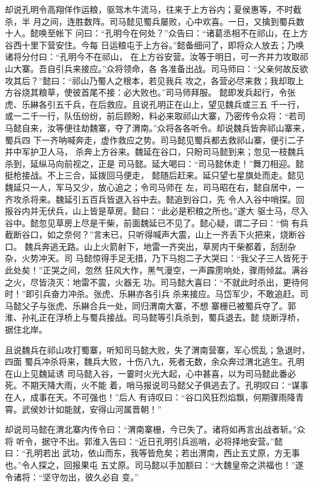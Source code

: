却说孔明令高翔佯作运粮，驱驾木牛流马，往来于上方谷内；夏侯惠等，不时截杀，半
月之间，连胜数阵。司马懿见蜀兵屡败，心中欢喜。一日，又擒到蜀兵数十人。懿唤至帐下
问曰：“孔明今在何处？”众告曰：“诸葛丞相不在祁山，在上方谷西十里下营安住。今每
日运粮屯于上方谷。”懿备细问了，即将众人放去；乃唤诸将分付曰：“孔明今不在祁山，
在上方谷安营。汝等于明日，可一齐并力攻取祁山大寨。吾自引兵来接应。”众将领命，各
各准备出战。司马师曰：“父亲何故反欲攻其后？”懿曰：“祁山乃蜀人之根本，若见我兵
攻之，各营必尽来救；我却取上方谷烧其粮草，使彼首尾不接：必大败也。”司马师拜服。
懿即发兵起行，令张虎、乐綝各引五千兵，在后救应。且说孔明正在山上，望见魏兵或三五
千一行，或一二千一行，队伍纷纷，前后顾盼，料必来取祁山大寨，乃密传令众将：“若司
马懿自来，汝等便往劫魏寨，夺了渭南。”众将各各听令。却说魏兵皆奔祁山寨来，蜀兵四
下一齐呐喊奔走，虚作救应之势。司马懿见蜀兵都去救祁山寨，便引二子并中军护卫人马，
杀奔上方谷来。魏延在谷口，只盼司马懿到来；忽见一枝魏兵杀到，延纵马向前视之，正是
司马懿。延大喝曰：“司马懿休走！”舞刀相迎。懿挺枪接战。不上三合，延拨回马便走，
懿随后赶来。延只望七星旗处而走。懿见魏延只一人，军马又少，放心追之；令司马师在
左，司马昭在右，懿自居中，一齐攻杀将来。魏延引五百兵皆退入谷中去。懿追到谷口，先
令人入谷中哨探。回报谷内并无伏兵，山上皆是草房。懿曰：“此必是积粮之所也。”遂大
驱士马，尽入谷中。懿忽见草房上尽是干柴，前面魏延已不见了。懿心疑，谓二子曰：“倘
有兵截断谷口，如之奈何？”言未已，只听得喊声大震，山上一齐丢下火把来，烧断谷口。
魏兵奔逃无路。山上火箭射下，地雷一齐突出，草房内干柴都着，刮刮杂杂，火势冲天。司
马懿惊得手足无措，乃下马抱二子大哭曰：“我父子三人皆死于此处矣！”正哭之间，忽然
狂风大作，黑气漫空，一声霹雳响处，骤雨倾盆。满谷之火，尽皆浇灭：地雷不震，火器无
功。司马懿大喜曰：“不就此时杀出，更待何时！”即引兵奋力冲杀。张虎、乐綝亦各引兵
杀来接应。马岱军少，不敢追赶。司马懿父子与张虎、乐綝合兵一处，同归渭南大寨，不想
寨栅已被蜀兵夺了。郭淮、孙礼正在浮桥上与蜀兵接战。司马懿等引兵杀到，蜀兵退去。懿
烧断浮桥，据住北岸。

且说魏兵在祁山攻打蜀寨，听知司马懿大败，失了渭南营寨，军心慌乱；急退时，四面
蜀兵冲杀将来，魏兵大败，十伤八九，死者无数，余众奔过渭北逃生。孔明在山上见魏延诱
司马懿入谷，一霎时火光大起，心中甚喜，以为司马懿此番必死。不期天降大雨，火不能
着，哨马报说司马懿父子俱逃去了。孔明叹曰：“谋事在人，成事在天。不可强也！”后人
有诗叹曰：“谷口风狂烈焰飘，何期骤雨降青霄。武侯妙计如能就，安得山河属晋朝！”

却说司马懿在渭北寨内传令曰：“渭南寨栅，今已失了。诸将如再言出战者斩。”众将
听令，据守不出。郭淮入告曰：“近日孔明引兵巡哨，必将择地安营。”懿曰：“孔明若出
武功，依山而东，我等皆危矣；若出渭南，西止五丈原，方无事也。”令人探之，回报果屯
五丈原。司马懿以手加额曰：“大魏皇帝之洪福也！”遂令诸将：“坚守勿出，彼久必自
变。”


